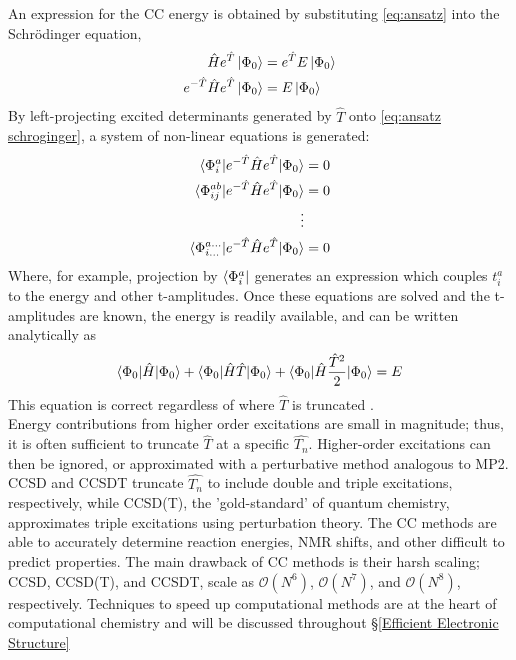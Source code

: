 \documentclass[letterpaper, 12pt]{article}
\begin{document}
An expression for the CC energy is obtained by substituting \eqref{eq:ansatz} into the Schr\"{o}dinger equation, 
\begin{align}
\hat{H} e^{\hat{T}}\ket{\Phi_{0}} &=  e^{\hat{T}} E \ket{\Phi_{0}}\\
e^{-\hat{T}} \hat{H} e^{\hat{T}}\ket{\Phi_{0}} &=E\ket{\Phi_{0}}\label{eq:ansatz schroginger}
\end{align}
By left-projecting excited determinants generated by $\hat{T}$  onto \eqref{eq:ansatz schroginger}, a system of non-linear equations is generated: 
\begin{align}
\begin{split}
\braket{\Phi^a_{i}| e^{-\hat{T}} \hat{H} e^{\hat{T}} |\Phi_{0}} &= 0 \\
\braket{\Phi^{ab}_{ij}| e^{-\hat{T}} \hat{H} e^{\hat{T}} |\Phi_{0}} &= 0\\ 
\vdots\\
\braket{\Phi^{a\dots}_{i\dots}| e^{-\hat{T}} \hat{H} e^{\hat{T}}|\Phi_{0}} &=0
\end{split}
\end{align}
Where, for example, projection by $\bra{\Phi^{a}_i}$ generates an expression which couples $t^a_i$ to the energy and other t-amplitudes. Once these equations are solved and the t-amplitudes are known, the energy is readily available, and can be written analytically as  
\begin{equation}
\braket{\Phi_0 | \hat{H} | \Phi_0} + \braket{\Phi_0 | \hat{H}  \hat{T}| \Phi_0} + \braket{\Phi_0 | \hat{H} \frac{\hat{T}^2}{2}| \Phi_0} = E
\end{equation}
This equation is correct regardless of where $\hat{T}$ is truncated \cite{reviews}.  \\

Energy contributions from higher order excitations are small in magnitude; thus, it is often sufficient to truncate $\hat{T}$ at a specific $\hat{T_n}$. Higher-order excitations can then be ignored, or approximated with a perturbative method analogous to MP2. CCSD and CCSDT truncate $\hat{T_n}$ to include double and triple excitations, respectively, while CCSD(T), the 'gold-standard' of quantum chemistry, approximates triple excitations using perturbation theory. The CC methods are able to accurately determine reaction energies, NMR shifts, and other difficult to predict properties. The main drawback of CC methods is their harsh scaling; CCSD, CCSD(T), and CCSDT, scale as $\mathcal{O}(N^6)$, $\mathcal{O}(N^7)$, and $\mathcal{O}(N^8)$, respectively. Techniques to speed up computational methods are at the heart of computational chemistry and will be discussed throughout \S\ref{Efficient Electronic Structure}
\end{document}

